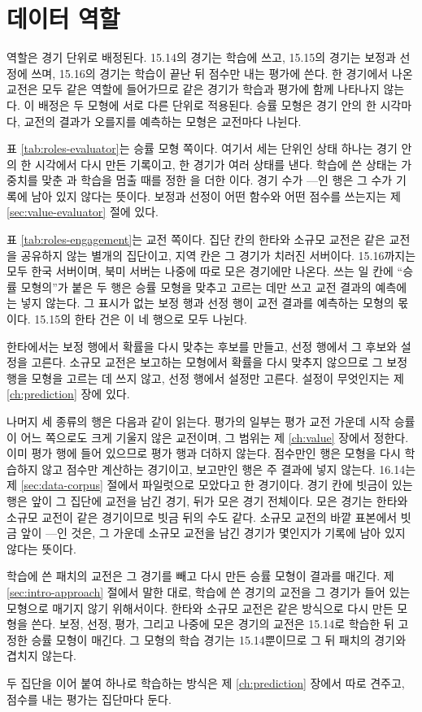 \section{데이터 역할}
\label{sec:data-roles}

역할은 경기 단위로 배정된다. 15.14의 경기는 학습에 쓰고, 15.15의 경기는 보정과 선정에 쓰며, 15.16의 경기는 학습이 끝난 뒤 점수만 내는 평가에 쓴다. 한 경기에서 나온 교전은 모두 같은 역할에 들어가므로 같은 경기가 학습과 평가에 함께 나타나지 않는다. 이 배정은 두 모형에 서로 다른 단위로 적용된다. 승률 모형은 경기 안의 한 시각마다, 교전의 결과가 오를지를 예측하는 모형은 교전마다 나뉜다.




표 \ref{tab:roles-evaluator}는 승률 모형 쪽이다. 여기서 세는 단위인 상태 하나는 경기 안의 한 시각에서 다시 만든 기록이고, 한 경기가 여러 상태를 낸다. 학습에 쓴 상태는 가중치를 맞춘 \numVFit{}과 학습을 멈출 때를 정한 \numVStop{}을 더한 \numVTrain{}이다. 경기 수가 ---인 행은 그 수가 기록에 남아 있지 않다는 뜻이다. 보정과 선정이 어떤 함수와 어떤 점수를 쓰는지는 제 \ref{sec:value-evaluator} 절에 있다.

표 \ref{tab:roles-engagement}는 교전 쪽이다. 집단 칸의 한타와 소규모 교전은 같은 교전을 공유하지 않는 별개의 집단이고, 지역 칸은 그 경기가 치러진 서버이다. 15.16까지는 모두 한국 서버이며, 북미 서버는 나중에 따로 모은 경기에만 나온다. 쓰는 일 칸에 ``승률 모형의''가 붙은 두 행은 승률 모형을 맞추고 고르는 데만 쓰고 교전 결과의 예측에는 넣지 않는다. 그 표시가 없는 보정 행과 선정 행이 교전 결과를 예측하는 모형의 몫이다. 15.15의 한타 \numTVal{}건은 이 네 행으로 모두 나뉜다.

한타에서는 보정 행에서 확률을 다시 맞추는 후보를 만들고, 선정 행에서 그 후보와 설정을 고른다. 소규모 교전은 보고하는 모형에서 확률을 다시 맞추지 않으므로 그 보정 행을 모형을 고르는 데 쓰지 않고, 선정 행에서 설정만 고른다. 설정이 무엇인지는 제 \ref{ch:prediction} 장에 있다.

나머지 세 종류의 행은 다음과 같이 읽는다. 평가의 일부는 평가 교전 가운데 시작 승률이 어느 쪽으로도 크게 기울지 않은 교전이며, 그 범위는 제 \ref{ch:value} 장에서 정한다. 이미 평가 행에 들어 있으므로 평가 행과 더하지 않는다. 점수만인 행은 모형을 다시 학습하지 않고 점수만 계산하는 경기이고, 보고만인 행은 주 결과에 넣지 않는다. 16.14는 제 \ref{sec:data-corpus} 절에서 파일럿으로 모았다고 한 경기이다. 경기 칸에 빗금이 있는 행은 앞이 그 집단에 교전을 남긴 경기, 뒤가 모은 경기 전체이다. 모은 경기는 한타와 소규모 교전이 같은 경기이므로 빗금 뒤의 수도 같다. 소규모 교전의 바깥 표본에서 빗금 앞이 ---인 것은, 그 가운데 소규모 교전을 남긴 경기가 몇인지가 기록에 남아 있지 않다는 뜻이다.

학습에 쓴 패치의 교전은 그 경기를 빼고 다시 만든 승률 모형이 결과를 매긴다. 제 \ref{sec:intro-approach} 절에서 말한 대로, 학습에 쓴 경기의 교전을 그 경기가 들어 있는 모형으로 매기지 않기 위해서이다. 한타와 소규모 교전은 같은 방식으로 다시 만든 모형을 쓴다. 보정, 선정, 평가, 그리고 나중에 모은 경기의 교전은 15.14로 학습한 뒤 고정한 승률 모형이 매긴다. 그 모형의 학습 경기는 15.14뿐이므로 그 뒤 패치의 경기와 겹치지 않는다.

두 집단을 이어 붙여 하나로 학습하는 방식은 제 \ref{ch:prediction} 장에서 따로 견주고, 점수를 내는 평가는 집단마다 둔다.
